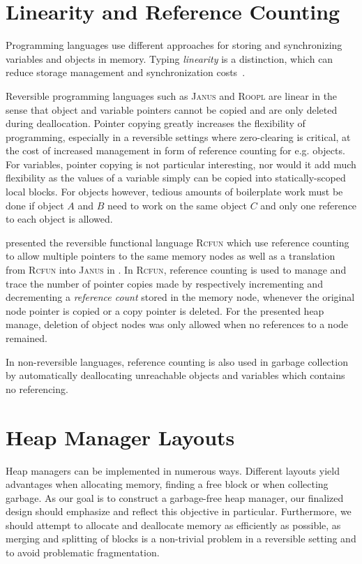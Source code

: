 \section{Linearity and Reference Counting}
\label{sec:referencing}
Programming languages use different approaches for storing and synchronizing variables and objects in memory. Typing \textit{linearity} is a distinction, which can reduce storage management and synchronization costs~\cite{hb:linearity}.

Reversible programming languages such as \textsc{Janus} and \textsc{Roopl} are linear in the sense that object and variable pointers cannot be copied and are only deleted during deallocation. Pointer copying greatly increases the flexibility of programming, especially in a reversible settings where zero-clearing is critical, at the cost of increased management in form of reference counting for e.g. objects. For variables, pointer copying is not particular interesting, nor would it add much flexibility as the values of a variable simply can be copied into statically-scoped local blocks. For objects however, tedious amounts of boilerplate work must be done if object $A$ and $B$ need to work on the same object $C$ and only one reference to each object is allowed.

\citeauthor{tm:refcounting} presented the reversible functional language \textsc{Rcfun} which use reference counting to allow multiple pointers to the same memory nodes as well as a translation from \textsc{Rcfun} into \textsc{Janus} in \cite{tm:refcounting}. In \textsc{Rcfun}, reference counting is used to manage and trace the number of pointer copies made by respectively incrementing and decrementing a \textit{reference count} stored in the memory node, whenever the original node pointer is copied or a copy pointer is deleted. For the presented heap manage, deletion of object nodes was only allowed when no references to a node remained.

In non-reversible languages, reference counting is also used in garbage collection by automatically deallocating unreachable objects and variables which contains no referencing. 


\section{Heap Manager Layouts}
\label{sec:heap-manager-layout}
Heap managers can be implemented in numerous ways. Different layouts yield advantages when allocating memory, finding a free block or when collecting garbage. As our goal is to construct a garbage-free heap manager, our finalized design should emphasize and reflect this objective in particular. Furthermore, we should attempt to allocate and deallocate memory as efficiently as possible, as merging and splitting of blocks is a non-trivial problem in a reversible setting and to avoid problematic fragmentation.

